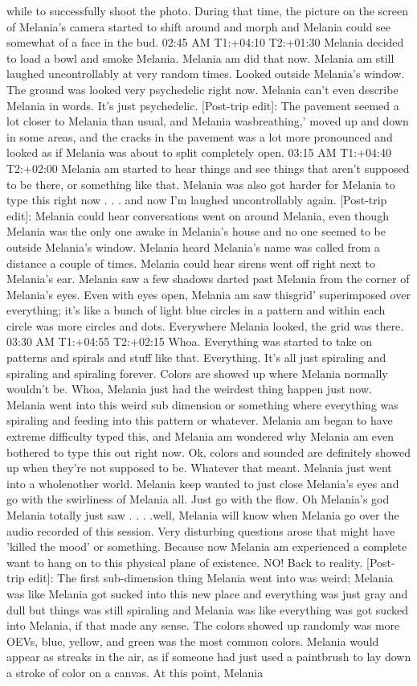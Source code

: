 \documentclass[12pt]{book}
\begin{document}
while to successfully shoot the photo. During that time, the picture on the screen of Melania's camera started to shift around and morph and Melania could see somewhat of a face in the bud. 02:45 AM T1:+04:10 T2:+01:30 Melania decided to load a bowl and smoke Melania. Melania am did that now. Melania am still laughed uncontrollably at very random times. Looked outside Melania's window. The ground was looked very psychedelic right now. Melania can't even describe Melania in words. It's just psychedelic. [Post-trip edit]: The pavement seemed a lot closer to Melania than usual, and Melania wasbreathing,' moved up and down in some areas, and the cracks in the pavement was a lot more pronounced and looked as if Melania was about to split completely open. 03:15 AM T1:+04:40 T2:+02:00 Melania am started to hear things and see things that aren't supposed to be there, or something like that. Melania was also got harder for Melania to type this right now . . . and now I'm laughed uncontrollably again. [Post-trip edit]: Melania could hear conversations went on around Melania, even though Melania was the only one awake in Melania's house and no one seemed to be outside Melania's window. Melania heard Melania's name was called from a distance a couple of times. Melania could hear sirens went off right next to Melania's ear. Melania saw a few shadows darted past Melania from the corner of Melania's eyes. Even with eyes open, Melania am saw thisgrid' superimposed over everything; it's like a bunch of light blue circles in a pattern and within each circle was more circles and dots. Everywhere Melania looked, the grid was there. 03:30 AM T1:+04:55 T2:+02:15 Whoa. Everything was started to take on patterns and spirals and stuff like that. Everything. It's all just spiraling and spiraling and spiraling forever. Colors are showed up where Melania normally wouldn't be. Whoa, Melania just had the weirdest thing happen just now. Melania went into this weird sub dimension or something where everything was spiraling and feeding into this pattern or whatever. Melania am began to have extreme difficulty typed this, and Melania am wondered why Melania am even bothered to type this out right now. Ok, colors and sounded are definitely showed up when they're not supposed to be. Whatever that meant. Melania just went into a wholenother world. Melania keep wanted to just close Melania's eyes and go with the swirliness of Melania all. Just go with the flow. Oh Melania's god Melania totally just saw . . . .well, Melania will know when Melania go over the audio recorded of this session. Very disturbing questions arose that might have 'killed the mood' or something. Because now Melania am experienced a complete want to hang on to this physical plane of existence. NO! Back to reality. [Post-trip edit]: The first sub-dimension thing Melania went into was weird; Melania was like Melania got sucked into this new place and everything was just gray and dull but things was still spiraling and Melania was like everything was got sucked into Melania, if that made any sense. The colors showed up randomly was more OEVs, blue, yellow, and green was the most common colors. Melania would appear as streaks in the air, as if someone had just used a paintbrush to lay down a stroke of color on a canvas. At this point, Melania 
\end{document}
